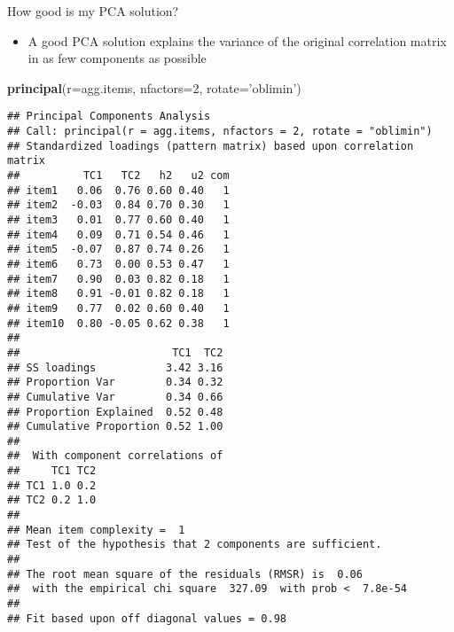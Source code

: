 \documentclass[
  ignorenonframetext,
]{beamer}
\newenvironment{Shaded}{\begin{snugshade}}{\end{snugshade}}
\newcommand{\DataTypeTok}[1]{\textcolor[rgb]{0.13,0.29,0.53}{#1}}
\newcommand{\DecValTok}[1]{\textcolor[rgb]{0.00,0.00,0.81}{#1}}
\newcommand{\KeywordTok}[1]{\textcolor[rgb]{0.13,0.29,0.53}{\textbf{#1}}}
\newcommand{\NormalTok}[1]{#1}
\newcommand{\StringTok}[1]{\textcolor[rgb]{0.31,0.60,0.02}{#1}}
\providecommand{\tightlist}{%
  \setlength{\itemsep}{0pt}\setlength{\parskip}{0pt}}
\begin{document}
\begin{frame}[fragile]{How good is my PCA solution?}
\protect\hypertarget{how-good-is-my-pca-solution}{}

\begin{itemize}
\tightlist
\item
  A good PCA solution explains the variance of the original correlation
  matrix in as few components as possible
\end{itemize}

\begin{Shaded}
\begin{Highlighting}[]
\KeywordTok{principal}\NormalTok{(}\DataTypeTok{r=}\NormalTok{agg.items, }\DataTypeTok{nfactors=}\DecValTok{2}\NormalTok{, }\DataTypeTok{rotate=}\StringTok{'oblimin'}\NormalTok{)}
\end{Highlighting}
\end{Shaded}

\begin{verbatim}
## Principal Components Analysis
## Call: principal(r = agg.items, nfactors = 2, rotate = "oblimin")
## Standardized loadings (pattern matrix) based upon correlation matrix
##          TC1   TC2   h2   u2 com
## item1   0.06  0.76 0.60 0.40   1
## item2  -0.03  0.84 0.70 0.30   1
## item3   0.01  0.77 0.60 0.40   1
## item4   0.09  0.71 0.54 0.46   1
## item5  -0.07  0.87 0.74 0.26   1
## item6   0.73  0.00 0.53 0.47   1
## item7   0.90  0.03 0.82 0.18   1
## item8   0.91 -0.01 0.82 0.18   1
## item9   0.77  0.02 0.60 0.40   1
## item10  0.80 -0.05 0.62 0.38   1
## 
##                        TC1  TC2
## SS loadings           3.42 3.16
## Proportion Var        0.34 0.32
## Cumulative Var        0.34 0.66
## Proportion Explained  0.52 0.48
## Cumulative Proportion 0.52 1.00
## 
##  With component correlations of 
##     TC1 TC2
## TC1 1.0 0.2
## TC2 0.2 1.0
## 
## Mean item complexity =  1
## Test of the hypothesis that 2 components are sufficient.
## 
## The root mean square of the residuals (RMSR) is  0.06 
##  with the empirical chi square  327.09  with prob <  7.8e-54 
## 
## Fit based upon off diagonal values = 0.98
\end{verbatim}

\end{frame}
\end{document}
